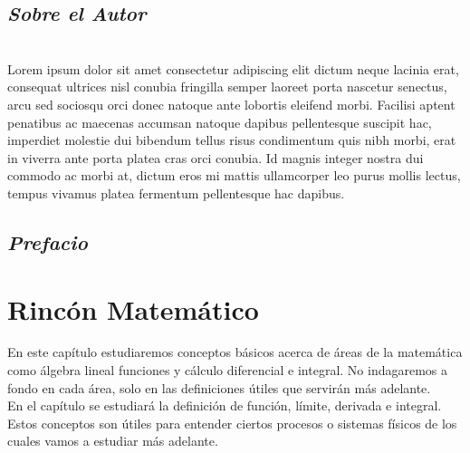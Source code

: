 

 



\restoregeometry
\tableofcontents
\thispagestyle{empty}
\newpage
\setcounter{page}{1}
\section*{\textbf{\textit{Sobre el Autor}}}

\lipsum[1-3] \\
Lorem ipsum dolor sit amet consectetur adipiscing elit dictum neque lacinia erat, consequat ultrices nisl conubia fringilla semper laoreet porta nascetur senectus, arcu sed sociosqu orci donec natoque ante lobortis eleifend morbi. Facilisi aptent penatibus ac maecenas accumsan natoque dapibus pellentesque suscipit hac, imperdiet molestie dui bibendum tellus risus condimentum quis nibh morbi, erat in viverra ante porta platea cras orci conubia. Id magnis integer nostra dui commodo ac morbi at, dictum eros mi mattis ullamcorper leo purus mollis lectus, tempus vivamus platea fermentum pellentesque hac dapibus.
\newpage
\section*{\textit{Prefacio}}
\lipsum[1-6]
\chapter{Rincón Matemático}
    En este capítulo estudiaremos conceptos básicos acerca de áreas de la matemática como álgebra lineal funciones y cálculo diferencial e integral. No indagaremos a fondo en cada área, solo en las definiciones útiles que servirán más adelante.\\
    
    En el capítulo se estudiará la definición de función, límite, derivada e integral. Estos conceptos son útiles para entender ciertos procesos o sistemas físicos de los cuales vamos a estudiar más adelante.
    \newpage
